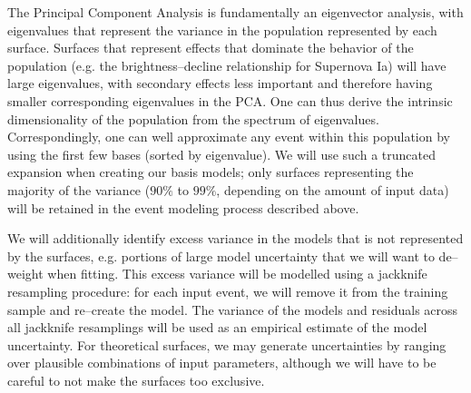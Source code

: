  The Principal Component
Analysis is fundamentally an eigenvector analysis, with eigenvalues that
represent the variance in the population represented by each surface. Surfaces
that represent effects that dominate the behavior of the population (e.g. the
brightness--decline relationship for Supernova Ia) will have large eigenvalues,
with secondary effects less important and therefore having smaller corresponding
eigenvalues in the PCA.  One can thus derive the intrinsic dimensionality of the
population from the spectrum of eigenvalues. Correspondingly, one can well
approximate any event within this population by using the first few bases
(sorted by eigenvalue).  We will use such a truncated expansion when creating
our basis models; only surfaces representing the majority of the variance
($90\%$ to $99\%$, depending on the amount of input data) will be retained in
the event modeling process described above.

 We will additionally identify
excess variance in the models that is not represented by the surfaces, e.g.
portions of large model uncertainty that we will want to de--weight when
fitting. This excess variance will be modelled using a jackknife resampling
procedure: for each input event, we will remove it from the training sample and
re--create the model.  The variance of the models and  residuals across all
jackknife resamplings will be used as an empirical estimate of the model
uncertainty.  For theoretical surfaces, we may generate uncertainties by ranging
over plausible combinations of input parameters, although we will have to be
careful to not make the surfaces too exclusive.

